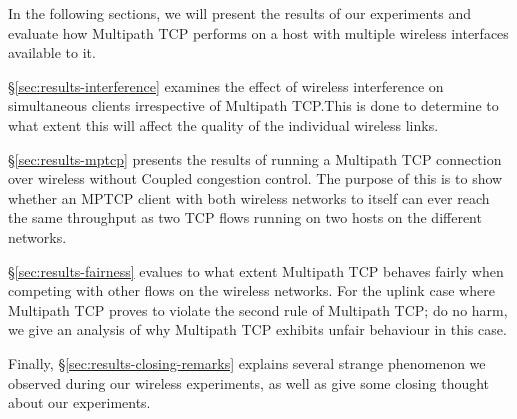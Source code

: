 In the following sections, we will present the results of our experiments and
evaluate how Multipath TCP performs on a host with multiple wireless
interfaces available to it.

\S\ref{sec:results-interference} examines the effect of wireless
interference on simultaneous clients irrespective of Multipath TCP.\@ This is
done to determine to what extent this will affect the quality of the individual
wireless links.

\S\ref{sec:results-mptcp} presents the results of running a Multipath TCP
connection over wireless without Coupled congestion control. The purpose of this
is to show whether an MPTCP client with both wireless networks to itself can
ever reach the same throughput as two TCP flows running on two hosts on
the different networks.

\S\ref{sec:results-fairness} evalues to what extent Multipath TCP behaves
fairly when competing with other flows on the wireless networks. For the uplink
case where Multipath TCP proves to violate the second rule of Multipath TCP; do
no harm, we give an analysis of why Multipath TCP exhibits unfair behaviour in
this case.

Finally, \S\ref{sec:results-closing-remarks} explains several strange phenomenon
we observed during our wireless experiments, as well as give some closing
thought about our experiments.
